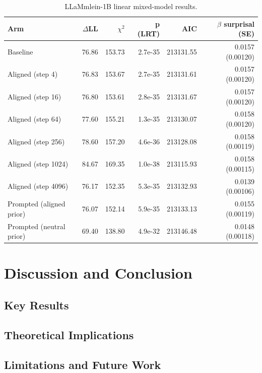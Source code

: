 \documentclass[10pt,letterpaper]{article}
\begin{document}
\begin{table}[t]
  \begin{center}
    \caption{LLaMmlein-1B linear mixed-model results.}
    \label{tab:llama-results}
    \vskip 0.12in
    \small
    \begin{tabular}{lrrrrr}
      \hline
      Arm & $\Delta$LL & $\chi^2$ & p (LRT) & AIC & $\beta$ surprisal (SE) \\
      \hline
      Baseline & 76.86 & 153.73 & 2.7e-35 & 213131.55 & 0.0157 (0.00120) \\
      Aligned (step 4) & 76.83 & 153.67 & 2.7e-35 & 213131.61 & 0.0157 (0.00120) \\
      Aligned (step 16) & 76.80 & 153.61 & 2.8e-35 & 213131.67 & 0.0157 (0.00120) \\
      Aligned (step 64) & 77.60 & 155.21 & 1.3e-35 & 213130.07 & 0.0158 (0.00120) \\
      Aligned (step 256) & 78.60 & 157.20 & 4.6e-36 & 213128.08 & 0.0158 (0.00119) \\
      Aligned (step 1024) & 84.67 & 169.35 & 1.0e-38 & 213115.93 & 0.0158 (0.00115) \\
      Aligned (step 4096) & 76.17 & 152.35 & 5.3e-35 & 213132.93 & 0.0139 (0.00106) \\
      Prompted (aligned prior) & 76.07 & 152.14 & 5.9e-35 & 213133.13 & 0.0155 (0.00119) \\
      Prompted (neutral prior) & 69.40 & 138.80 & 4.9e-32 & 213146.48 & 0.0148 (0.00118) \\
      \hline
    \end{tabular}
  \end{center}
\end{table}

\section{Discussion and Conclusion}

\subsection{Key Results}

\subsection{Theoretical Implications}

\subsection{Limitations and Future Work}
\end{document}
